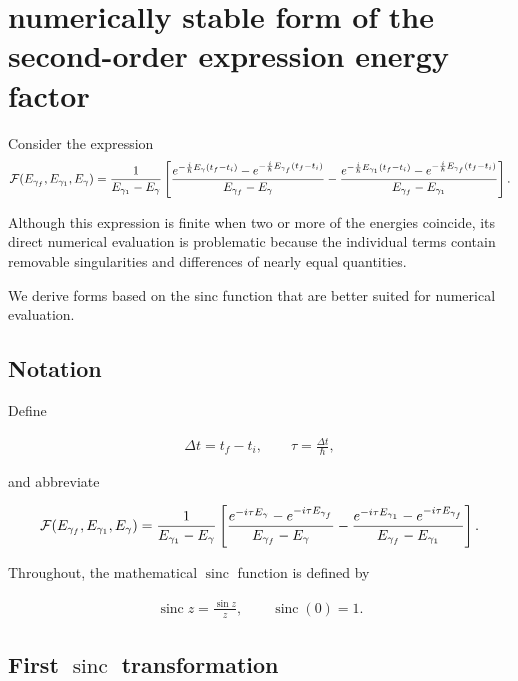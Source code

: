 \section{ numerically stable form of the second-order expression energy factor}

Consider the expression
\begin{align}
  {\cal F}(E_{\gamma_f}, E_{\gamma_1}, E_\gamma)= \frac{1}{E_{\gamma_1}-E_\gamma} \left[
    \frac{e^{-\frac{i}{\hbar}E_\gamma(t_f-t_i)}
    -e^{-\frac{i}{\hbar}E_{\gamma_f}(t_f-t_i)}}
    {E_{\gamma_f}-E_\gamma}
    -
    \frac{e^{-\frac{i}{\hbar}E_{\gamma_1}(t_f-t_i)}
    -e^{-\frac{i}{\hbar}E_{\gamma_f}(t_f-t_i)}}
    {E_{\gamma_f}-E_{\gamma_1}}
  \right].
\end{align}

Although this expression is finite when two or more of the energies
coincide, its direct numerical evaluation is problematic because the
individual terms contain removable singularities and differences of
nearly equal quantities.

We derive forms based on the sinc function that are better suited for
numerical evaluation.

\subsection{ Notation}

Define

\begin{align}\Delta t=t_f-t_i, \qquad
  \tau=\frac{\Delta t}{\hbar},
\end{align}

and abbreviate

\begin{align}    {\cal F}(E_{\gamma_f}, E_{\gamma_1}, E_\gamma)= \frac{1}{E_{\gamma_1}-E_\gamma} \left[
    \frac{e^{-i\tau E_\gamma}-e^{-i\tau E_{\gamma_f}}}{E_{\gamma_f}-E_\gamma}
    -
    \frac{e^{-i\tau E_{\gamma_1}}-e^{-i\tau E_{\gamma_f}}}{E_{\gamma_f}-E_{\gamma_1}}
  \right].
\end{align}

Throughout, the mathematical $\operatorname{sinc}$ function is defined by

\begin{align}\operatorname{sinc}z=\frac{\sin z}{z}, \qquad
  \operatorname{sinc}(0)=1.
\end{align}

\subsection{ First $\operatorname{sinc}$ transformation}\label{sec:app-stable-second-order}

